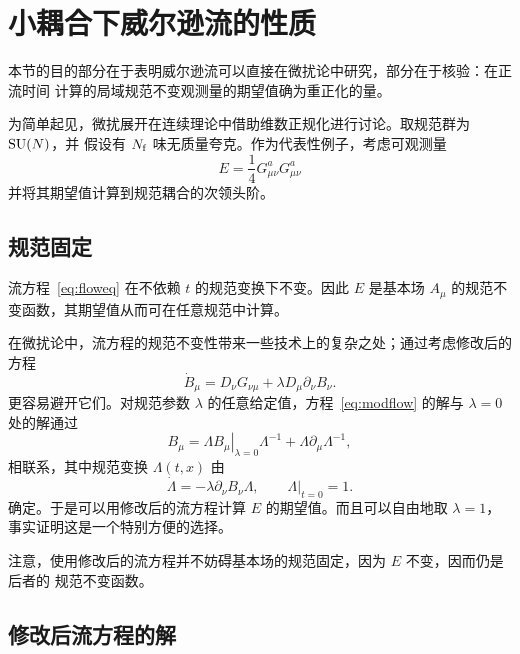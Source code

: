 \section{小耦合下威尔逊流的性质}

本节的目的部分在于表明威尔逊流可以直接在微扰论中研究，部分在于核验：在正流时间
计算的局域规范不变观测量的期望值确为重正化的量。

为简单起见，微扰展开在连续理论中借助维数正规化进行讨论。取规范群为 $\mathrm{SU}(N)$，并
假设有 $N_{\mathrm{f}}$ 味无质量夸克。作为代表性例子，考虑可观测量
\begin{equation}
   E=\frac{1}{4}G_{\mu\nu}^aG_{\mu\nu}^a
   \label{eq:Edens}
\end{equation}
并将其期望值计算到规范耦合的次领头阶。


\subsection{规范固定}

流方程~\eqref{eq:floweq} 在不依赖 $t$ 的规范变换下不变。因此 $E$ 是基本场
$A_{\mu}$ 的规范不变函数，其期望值从而可在任意规范中计算。

在微扰论中，流方程的规范不变性带来一些技术上的复杂之处；通过考虑修改后的方程
\begin{equation}
  \dot{B}_{\mu}=D_{\nu}G_{\nu\mu}+\lambda D_{\mu}\partial_{\nu}B_{\nu}.
  \label{eq:modflow}
\end{equation}
更容易避开它们。对规范参数 $\lambda$ 的任意给定值，方程~\eqref{eq:modflow} 的解与
$\lambda=0$ 处的解通过
\begin{equation}
  B_{\mu}=\Lambda\!\left.B_{\mu}\right|_{\lambda=0}\Lambda^{-1}
  +\Lambda\partial_{\mu}\Lambda^{-1},
  \label{eq:gaugetrafo}
\end{equation}
相联系，其中规范变换 $\Lambda(t,x)$ 由
\begin{equation}
  \dot{\Lambda}=-\lambda \partial_{\nu}B_{\nu}\Lambda,
  \qquad\left.\Lambda\right|_{t=0}=1.
  \label{eq:Lambdatrafo}
\end{equation}
确定。于是可以用修改后的流方程计算 $E$ 的期望值。而且可以自由地取 $\lambda=1$，
事实证明这是一个特别方便的选择。

注意，使用修改后的流方程并不妨碍基本场的规范固定，因为 $E$ 不变，因而仍是后者的
规范不变函数。

\subsection{修改后流方程的解}

